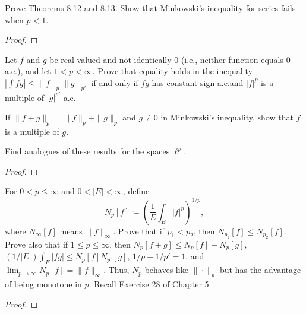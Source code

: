 \begin{problem}
Prove Theorems 8.12 and 8.13. Show that Minkowski’s inequality for series
fails when $p<1$.
\end{problem}
\begin{proof}
\end{proof}
\newpage

\begin{problem}
Let $f$ and $g$ be real-valued and not identically $0$ (i.e., neither
function equals $0$ a.e.), and let $1<p<\infty$. Prove that equality holds
in the inequality $\left|\int fg\right|\leq\|f\|_p\|g\|_{p'}$ if and only if
$fg$ has constant sign a.e.\@ and $|f|^p$ is a multiple of $|g|^{p'}$ a.e.

If $\|f+g\|_p=\|f\|_p+\|g\|_{p}$ and $g\neq 0$ in Minkowski's inequality,
show that $f$ is a multiple of $g$.

Find analogues of these results for the spaces $\ell^p$.
\end{problem}
\begin{proof}
\end{proof}
\newpage

\begin{problem}
For $0<p\leq\infty$ and $0<|E|<\infty$, define
\[
N_p[f]\coloneqq\left(\frac{1}{E}\int_E|f|^p\right)^{1/p},
\]
where $N_\infty[f]$ means $\|f\|_\infty$. Prove that if $p_1<p_2$, then
$N_{p_1}[f]\leq N_{p_2}[f]$. Prove also that if $1\leq p\leq \infty$, then
$N_p[f+g]\leq N_p[f]+N_p[g]$, $(1/|E|)\int_E|fg|\leq N_p[f]N_{p'}[g]$,
$1/p+1/p'=1$, and $\lim_{p\to\infty} N_p[f]=\|f\|_\infty$. Thus, $N_p$
behaves like $\|\cdot\|_p$ but has the advantage of being monotone in
$p$. Recall Exercise 28 of Chapter 5.
\end{problem}
\begin{proof}
\end{proof}
\newpage

